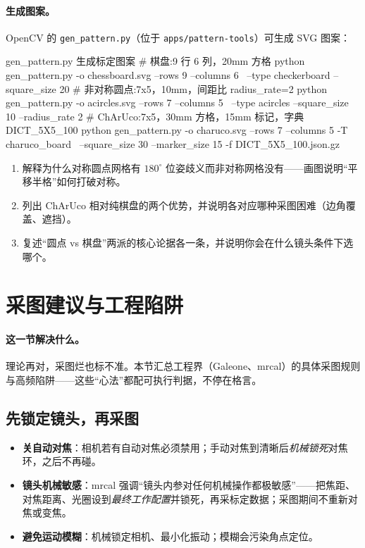 \paragraph{生成图案。}
OpenCV 的 \texttt{gen\_pattern.\allowbreak py}（位于 \texttt{apps/\allowbreak pattern-tools}）可生成 SVG 图案\cite{opencv2024pattern}：

\begin{codebox}[bash]{gen\_pattern.py 生成标定图案}
# 棋盘:9 行 6 列，20mm 方格
python gen_pattern.py -o chessboard.svg --rows 9 --columns 6 \
       --type checkerboard --square_size 20
# 非对称圆点:7x5，10mm，间距比 radius_rate=2
python gen_pattern.py -o acircles.svg --rows 7 --columns 5 \
       --type acircles --square_size 10 --radius_rate 2
# ChArUco:7x5，30mm 方格，15mm 标记，字典 DICT_5X5_100
python gen_pattern.py -o charuco.svg --rows 7 --columns 5 -T charuco_board \
       --square_size 30 --marker_size 15 -f DICT_5X5_100.json.gz
\end{codebox}

\begin{practice}[练习]
\begin{enumerate}
  \item 解释为什么对称圆点网格有 $180^\circ$ 位姿歧义而非对称网格没有——画图说明“平移半格”如何打破对称。
  \item 列出 ChArUco 相对纯棋盘的两个优势，并说明各对应哪种采图困难（边角覆盖、遮挡）。
  \item 复述“圆点 vs 棋盘”两派的核心论据各一条，并说明你会在什么镜头条件下选哪个。
\end{enumerate}
\end{practice}

\section{采图建议与工程陷阱}
\label{sec:calib-capture}

\paragraph{这一节解决什么。}
理论再对，采图烂也标不准。本节汇总工程界（Galeone\cite{galeone2018guidelines}、mrcal\cite{kogan2024mrcal}）的具体采图规则与高频陷阱——这些“心法”都配可执行判据，不停在格言。

\subsection{先锁定镜头，再采图}
\begin{itemize}
  \item \textbf{关自动对焦}：相机若有自动对焦必须禁用\cite{galeone2018guidelines}；手动对焦到清晰后\emph{机械锁死}对焦环，之后不再碰。
  \item \textbf{镜头机械敏感}：mrcal\cite{kogan2024mrcal} 强调“镜头内参对任何机械操作都极敏感”——把焦距、对焦距离、光圈设到\emph{最终工作配置}并锁死，再采标定数据；采图期间不重新对焦或变焦。
  \item \textbf{避免运动模糊}：机械锁定相机、最小化振动；模糊会污染角点定位。
\end{itemize}

